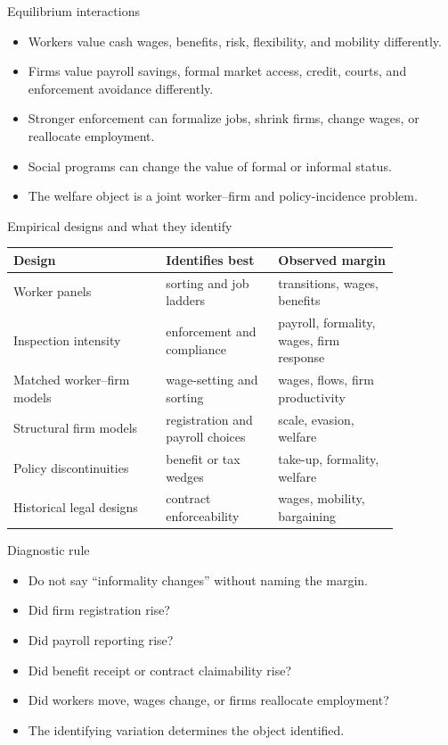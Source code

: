\documentclass[aspectratio=169,11pt]{beamer}
\begin{document}
\begin{frame}{Equilibrium interactions}
\begin{itemize}
    \item Workers value cash wages, benefits, risk, flexibility, and mobility differently.
    \item Firms value payroll savings, formal market access, credit, courts, and enforcement avoidance differently.
    \item Stronger enforcement can formalize jobs, shrink firms, change wages, or reallocate employment.
    \item Social programs can change the value of formal or informal status.
    \item The welfare object is a joint worker--firm and policy-incidence problem.
\end{itemize}
\end{frame}

\begin{frame}{Empirical designs and what they identify}
\small
\begin{tabular}{p{0.34\linewidth} p{0.25\linewidth} p{0.27\linewidth}}
\toprule
Design & Identifies best & Observed margin \\
\midrule
Worker panels & sorting and job ladders & transitions, wages, benefits \\
Inspection intensity & enforcement and compliance & payroll, formality, wages, firm response \\
Matched worker--firm models & wage-setting and sorting & wages, flows, firm productivity \\
Structural firm models & registration and payroll choices & scale, evasion, welfare \\
Policy discontinuities & benefit or tax wedges & take-up, formality, welfare \\
Historical legal designs & contract enforceability & wages, mobility, bargaining \\
\bottomrule
\end{tabular}
\end{frame}

\begin{frame}{Diagnostic rule}
\begin{itemize}
    \item Do not say ``informality changes'' without naming the margin.
    \item Did firm registration rise?
    \item Did payroll reporting rise?
    \item Did benefit receipt or contract claimability rise?
    \item Did workers move, wages change, or firms reallocate employment?
    \item The identifying variation determines the object identified.
\end{itemize}
\end{frame}
\end{document}
